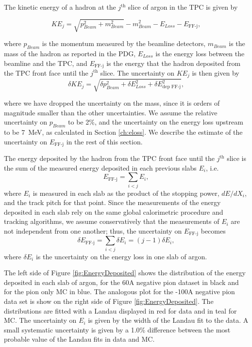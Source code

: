 The kinetic energy of a hadron at the $j^{\text{th}}$ slice of argon in the TPC is given by

\begin{equation}
KE_{j} = \sqrt{p_{Beam}^2 + m_{Beam}^2} - m_{Beam}^2 - E_{Loss} - E_{\text{FF-j}},
\end{equation}

where $p_{Beam}$ is the momentum measured by the beamline detectors,  $m_{Beam}$ is the mass of the hadron as reported in the PDG,  $E_{Loss}$  is the energy loss between the beamline and the TPC, and $ E_{\text{FF-j}}$ is the energy that the hadron deposited from the TPC front face until the $j^{\text{th}}$ slice.
The uncertainty on $KE_{j}$ is then given by 
\begin{equation}
\delta KE_{j} = \sqrt{\delta p_{Beam}^2 + \delta E_{Loss}^2 +  \delta  E_{\text{dep FF-j}}^2},
\end{equation}

where we have dropped the uncertainty on the mass, since it is orders of magnitude smaller than the other uncertainties.
We assume the relative uncertainty on $p_{Beam}$ to be 2\%, and the uncertainty on the energy loss upstream to be 7~MeV, as calculated in Section \ref{ch:eloss}. We describe the estimate of the uncertainty on $E_{\text{FF-j}}$ in the rest of this section.

The energy deposited by the hadron from the TPC front face until the $j^{\text{th}}$ slice is the sum of the measured energy deposited in each previous slabs $E_{i}$, i.e.
\begin{equation}
E_{\text{FF-j}} = \sum_{i<j} E_{i}, 
\end{equation}
where $E_{i}$ is measured in each slab as  the product of the stopping power,  $dE/dX_{i}$,  and the track pitch for that point. Since the measurements of the energy deposited in each slab rely on the same global calorimetric procedure and tracking algorithms, we assume conservatively that the measurements of $E_{i}$ are not independent from one another; thus, the uncertainty on $E_{\text{FF-j}}$ becomes
\begin{equation}
\delta E_{\text{FF-j}} =  \sum_{i<j}  \delta E_{i} = (j-1) \delta E_{i}, 
\end{equation}
where $\delta E_{i}$ is the uncertainty on the energy loss in one slab of argon.

The left side of Figure \ref{fig:EnergyDeposited} shows the distribution of the energy deposited in each slab of argon, for the 60A negative pion dataset in black and for the pion only MC in blue. The analogous plot for the -100A negative pion data set  is show on the right side of Figure \ref{fig:EnergyDeposited}.  The distributions are fitted with a Landau displayed in red for data and in teal for MC.
The uncertainty on $E_{i}$ is given by the width of the Landau fit to the data. A small systematic uncertainty  is given by a 1.0\% difference between the most probable value of the Landau fits in data and MC.

